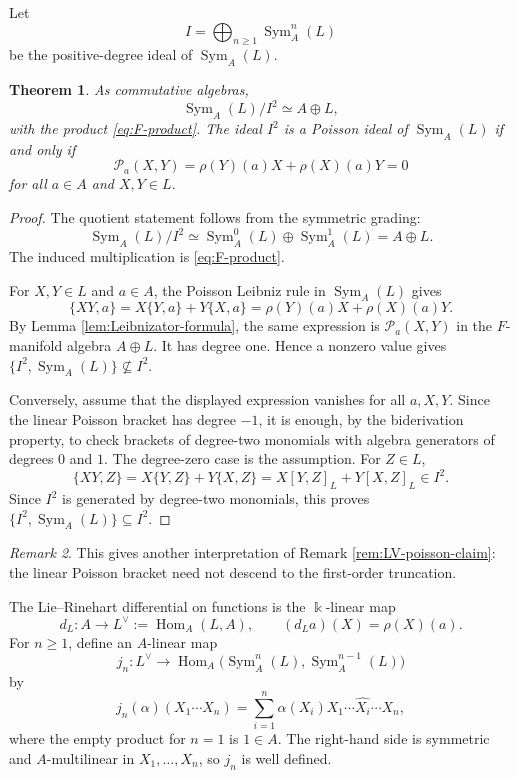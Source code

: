 \documentclass[12pt,reqno]{amsart}
\newtheorem{theorem}{Theorem}[section]
\theoremstyle{definition}
\theoremstyle{remark}
\newtheorem{remark}[theorem]{Remark}
\newcommand{\kk}{\Bbbk}
\newcommand{\Sym}{\operatorname{Sym}}
\newcommand{\Pcal}{\mathcal P}
\begin{document}
	Let
	\[
	I=\bigoplus_{n\geq1}\Sym_A^n(L)
	\]
	be the positive-degree ideal of $\Sym_A(L)$.
	
	\begin{theorem}\label{thm:first-order-truncation}
		As commutative algebras,
		\[
		\Sym_A(L)/I^2\simeq A\oplus L,
		\]
		with the product \eqref{eq:F-product}.  The ideal $I^2$ is a Poisson ideal of
		$\Sym_A(L)$ if and only if
		\[
		\Pcal_a(X,Y)=\rho(Y)(a)X+\rho(X)(a)Y=0
		\]
		for all $a\in A$ and $X,Y\in L$.
	\end{theorem}
	
	\begin{proof}
		The quotient statement follows from the symmetric grading:
		\[
		\Sym_A(L)/I^2\simeq \Sym_A^0(L)\oplus \Sym_A^1(L)=A\oplus L.
		\]
		The induced multiplication is \eqref{eq:F-product}.
		
		For $X,Y\in L$ and $a\in A$, the Poisson Leibniz rule in $\Sym_A(L)$ gives
		\[
		\{XY,a\}=X\{Y,a\}+Y\{X,a\}
		=\rho(Y)(a)X+\rho(X)(a)Y.
		\]
		By Lemma \ref{lem:Leibnizator-formula}, the same expression is
		$\Pcal_a(X,Y)$ in the $F$-manifold algebra $A\oplus L$.  It has
		degree one.  Hence a nonzero value gives
		$\{I^2,\Sym_A(L)\}\not\subseteq I^2$.
		
		Conversely, assume that the displayed expression vanishes for all $a,X,Y$.
		Since the linear Poisson bracket has  degree $-1$, it is enough, by
		the biderivation property, to check brackets of degree-two monomials with
		algebra generators of degrees $0$ and $1$.  The degree-zero case is the
		assumption.  For $Z\in L$,
		\[
		\{XY,Z\}=X\{Y,Z\}+Y\{X,Z\}=X[Y,Z]_L+Y[X,Z]_L\in I^2.
		\]
		Since $I^2$ is generated by degree-two monomials, this proves
		$\{I^2,\Sym_A(L)\}\subseteq I^2$.
	\end{proof}
	
	
	
	\begin{remark}
		This gives another interpretation of Remark \ref{rem:LV-poisson-claim}: the
		linear Poisson bracket need not descend to the first-order truncation.
	\end{remark}
	
	The Lie--Rinehart differential on functions is the $\kk$-linear map
	\[
	d_L:A\longrightarrow L^\vee:=\operatorname{Hom}_A(L,A),
	\qquad
	(d_La)(X)=\rho(X)(a).
	\]
	For $n\geq1$, define an $A$-linear map
	\[
	j_n:L^\vee\longrightarrow
	\operatorname{Hom}_A\bigl(\Sym_A^n(L),\Sym_A^{n-1}(L)\bigr)
	\]
	by
	\begin{equation}\label{eq:jn-map}
		j_n(\alpha)(X_1\cdots X_n)
		=\sum_{i=1}^n \alpha(X_i)
		X_1\cdots\widehat{X_i}\cdots X_n,
	\end{equation}
	where the empty product for $n=1$ is $1\in A$.  The right-hand side is
	symmetric and $A$-multilinear in $X_1,\ldots,X_n$, so $j_n$ is well defined.
	
\end{document}
